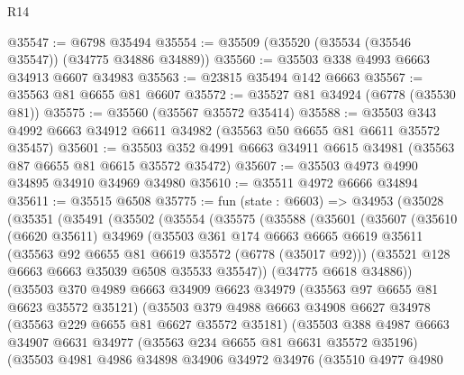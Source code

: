 \begin{lexlean}{R14}
\begin{coremodule}
@35547 := @6798 @35494
@35554 := @35509 (@35520 (@35534 (@35546 @35547)) (@34775 @34886 @34889))
@35560 := @35503 @338 @4993 @6663 @34913 @6607 @34983
@35563 := @23815 @35494 @142 @6663
@35567 := @35563 @81 @6655 @81 @6607
@35572 := @35527 @81 @34924 (@6778 (@35530 @81))
@35575 := @35560 (@35567 @35572 @35414)
@35588 := @35503 @343 @4992 @6663 @34912 @6611 @34982 (@35563 @50 @6655 @81 @6611 @35572 @35457)
@35601 := @35503 @352 @4991 @6663 @34911 @6615 @34981 (@35563 @87 @6655 @81 @6615 @35572 @35472)
@35607 := @35503 @4973 @4990 @34895 @34910 @34969 @34980
@35610 := @35511 @4972 @6666 @34894
@35611 := @35515 @6508
@35775 := fun (state : @6603) =>
  @34953
    (@35028
      (@35351
        (@35491
          (@35502
            (@35554
              (@35575
                (@35588
                  (@35601
                    (@35607
                      (@35610
                        (@6620 @35611)
                        @34969
                        (@35503
                          @361
                          @174
                          @6663
                          @6665
                          @6619
                          @35611
                          (@35563 @92 @6655 @81 @6619 @35572 (@6778 (@35017 @92)))
                          (@35521 @128 @6663 @6663 @35039 @6508 @35533 @35547))
                        (@34775 @6618 @34886))
                      (@35503
                        @370
                        @4989
                        @6663
                        @34909
                        @6623
                        @34979
                        (@35563 @97 @6655 @81 @6623 @35572 @35121)
                        (@35503
                          @379
                          @4988
                          @6663
                          @34908
                          @6627
                          @34978
                          (@35563 @229 @6655 @81 @6627 @35572 @35181)
                          (@35503
                            @388
                            @4987
                            @6663
                            @34907
                            @6631
                            @34977
                            (@35563 @234 @6655 @81 @6631 @35572 @35196)
                            (@35503
                              @4981
                              @4986
                              @34898
                              @34906
                              @34972
                              @34976
                              (@35510
                                @4977
                                @4980

\end{coremodule}
\end{lexlean}

